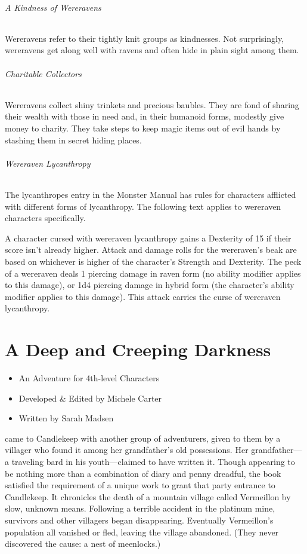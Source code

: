 \documentclass[10pt,a4paper,twoside,bg=print,twocolumn,openany,nodeprecatedcode]{dndbook}
\begin{document}
\subparagraph{A Kindness of Wereravens}
Wereravens refer to their tightly knit groups as kindnesses. Not surprisingly, wereravens get along well with ravens and often hide in plain sight among them.

\subparagraph{Charitable Collectors}
Wereravens collect shiny trinkets and precious baubles. They are fond of sharing their wealth with those in need and, in their humanoid forms, modestly give money to charity. They take steps to keep magic items out of evil hands by stashing them in secret hiding places.

\subparagraph{Wereraven Lycanthropy}
The lycanthropes entry in the Monster Manual has rules for characters afflicted with different forms of lycanthropy. The following text applies to wereraven characters specifically.

\begin{DndSidebar}[float=!b]{}
A character cursed with wereraven lycanthropy gains a Dexterity of 15 if their score isn't already higher. Attack and damage rolls for the wereraven's beak are based on whichever is higher of the character's Strength and Dexterity. The peck of a wereraven deals 1 piercing damage in raven form (no ability modifier applies to this damage), or 1d4 piercing damage in hybrid form (the character's ability modifier applies to this damage). This attack carries the curse of wereraven lycanthropy.



\end{DndSidebar}

\chapter{A Deep and Creeping Darkness}

\begin{itemize}
\item An Adventure for 4th-level Characters
\item Developed \& Edited by Michele Carter
\item Written by Sarah Madsen
\end{itemize}

 came to Candlekeep with another group of adventurers, given to them by a villager who found it among her grandfather's old possessions. Her grandfather—a traveling bard in his youth—claimed to have written it. Though appearing to be nothing more than a combination of diary and penny dreadful, the book satisfied the requirement of a unique work to grant that party entrance to Candlekeep. It chronicles the death of a mountain village called Vermeillon by slow, unknown means. Following a terrible accident in the platinum mine, survivors and other villagers began disappearing. Eventually Vermeillon's population all vanished or fled, leaving the village abandoned. (They never discovered the cause: a nest of meenlocks.)
\end{document}

